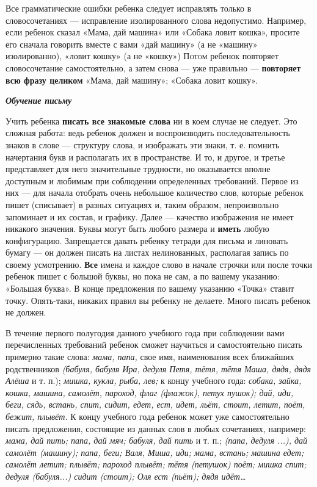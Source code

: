 \documentclass{book}
\renewcommand{\emph}[1]{\textit{#1}}
\begin{document}
Все грамматические ошибки ребенка следует исправлять только в
словосочетаниях --- исправление изолированного слова недопустимо.
Например, если ребенок сказал «Мама, дай машина» или «Собака ловит
кошка», просите его сначала говорить вместе с вами «дай машину» (а не
«машину» изолированно), «ловит кошку» (а не «кошку»\textsc{) Потом}
ребенок повторяет словосочетание самостоятельно, а затем снова --- уже
правильно --- \textbf{повторяет всю фразу целиком} «Мама, дай машину»;
«Собака ловит кошку».

\emph{\textbf{Обучение письму}}

Учить ребенка \textbf{писать все знакомые слова} ни в коем случае не
следует. Это сложная работа: ведь ребенок должен и воспроизводить
последовательность знаков в слове --- структуру слова, и изображать эти
знаки, т. е. помнить начертания букв и располагать их в пространстве. И
то, и другое, и третье представляет для него значительные трудности, но
оказывается вполне доступным и любимым при соблюдении определенных
требований. Первое из них --- для начала отобрать очень небольшое
количество слов, которые ребенок пишет (списывает) в разных ситуациях и,
таким образом, непроизвольно запоминает и их состав, и графику. Далее
--- качество изображения не имеет никакого значения. Буквы могут быть
любого размера и \textbf{иметь} любую конфигурацию. Запрещается давать
ребенку тетради для письма и линовать бумагу --- он должен писать на
листах нелинованных, располагая запись по своему усмотрению.
\textbf{Все} имена и каждое слово в начале строчки или после точки
ребенок пишет с большой буквы, но пока не сам, а по вашему указанию:
«Большая буква». В конце предложения по вашему указанию «Точка» ставит
точку. Опять-таки, никаких правил вы ребенку не делаете. Много писать
ребенок не должен.

В течение первого полугодия данного учебного года при соблюдении вами
перечисленных требований ребенок сможет научиться и самостоятельно
писать примерно такие слова: \emph{мама, папа,} свое имя, наименования
всех ближайших родственников \emph{(бабуля, бабуля Ира, дедуля Петя,
тётя, тётя Маша, дядя, дядя Алёша} и т. п.); \emph{мишка, кукла, рыба,
лев;} к концу учебного года: \emph{собака, зайка, кошка, машина,
самолёт, пароход, флаг (флажок), петух пушок); дай, иди, беги, сядь,
встань, спит, сидит, едет, ест, идет, льёт, стоит, летит, поёт, бежит,
плывёт.} К концу учебного года ребенок может уже самостоятельно писать
предложения, состоящие из данных слов в любых сочетаниях, например:
\emph{мама, дай пить; папа, дай мяч; бабуля, дай пить} и т. п.;
\emph{(папа, дедуля ...), дай самолёт (машину); папа, беги; Валя, Миша,
иди; мама, встань; машина едет; самолёт летит; плывёт; пароход плывёт;
тётя (петушок) поёт; мишка спит; дедуля (бабуля...) сидит (стоит); Оля
ест (пьёт); дядя идёт\ldots{}}
\end{document}
